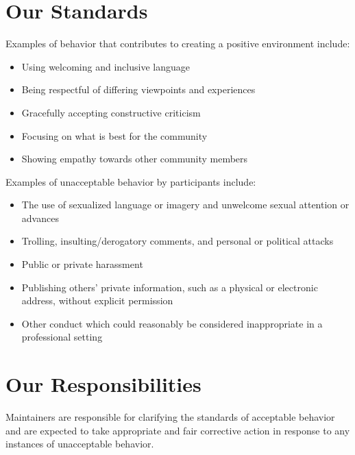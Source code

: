 \documentclass[letterpaper,10pt,english]{sphinxmanual}
\begin{document}
\section{Our Standards}
\label{\detokenize{Code-of-conduct:our-standards}}
\sphinxAtStartPar
Examples of behavior that contributes to creating a positive environment
include:
\begin{itemize}
\item {} 
\sphinxAtStartPar
Using welcoming and inclusive language

\item {} 
\sphinxAtStartPar
Being respectful of differing viewpoints and experiences

\item {} 
\sphinxAtStartPar
Gracefully accepting constructive criticism

\item {} 
\sphinxAtStartPar
Focusing on what is best for the community

\item {} 
\sphinxAtStartPar
Showing empathy towards other community members

\end{itemize}

\sphinxAtStartPar
Examples of unacceptable behavior by participants include:
\begin{itemize}
\item {} 
\sphinxAtStartPar
The use of sexualized language or imagery and unwelcome sexual attention or
advances

\item {} 
\sphinxAtStartPar
Trolling, insulting/derogatory comments, and personal or political attacks

\item {} 
\sphinxAtStartPar
Public or private harassment

\item {} 
\sphinxAtStartPar
Publishing others’ private information, such as a physical or electronic
address, without explicit permission

\item {} 
\sphinxAtStartPar
Other conduct which could reasonably be considered inappropriate in a
professional setting

\end{itemize}


\section{Our Responsibilities}
\label{\detokenize{Code-of-conduct:our-responsibilities}}
\sphinxAtStartPar
Maintainers are responsible for clarifying the standards of acceptable behavior
and are expected to take appropriate and fair corrective action in response to
any instances of unacceptable behavior.
\end{document}
